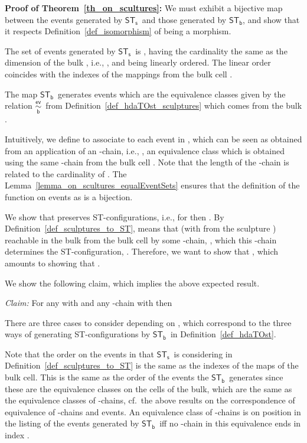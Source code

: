 \documentclass[submission,copyright,creativecommons]{eptcs}
\newenvironment{proof}[1][\!\!\,]{\vspace{1ex}\noindent\textbf{Proof #1: }}{\hfill\vspace{2ex}}
\newcounter{case}
\newcommand\sculpintost{\ensuremath{\mathsf{ST}_{\!\mathsf{s}}}}
\newcommand\hintostScultures{\ensuremath{\mathsf{ST}_{\!\mathsf{b}}}}
\newcommand\eventEquivHDAsculpture{\ensuremath{\overset{\mathsf{ev}}{\underset{\mathsf{b}}{\sim}}}}
\begin{document}
\begin{proof}[of Theorem~\ref{th_on_scultures}]
We must exhibit a bijective map  between the events generated by \sculpintost\ and those generated by \hintostScultures, and show that it respects Definition~\ref{def_isomorphism} of being a morphism. 

The set of events generated by \sculpintost\ is , having the cardinality the same as the dimension of the bulk , i.e., , and being linearly ordered. The linear order coincides with the indexes of the mappings from the bulk cell . 

The map \hintostScultures\ generates events which are the equivalence classes given by the relation \eventEquivHDAsculpture\ from Definition~\ref{def_hdaTOst_sculptures} which comes from the bulk .


Intuitively, we define  to associate to each event in , which can be seen as obtained from an application of an -chain, i.e., , an equivalence class which is obtained using the same -chain from the bulk cell . Note that the length of the -chain is related to the cardinality of .
The Lemma~\ref{lemma_on_scultures_equalEventSets} ensures that the definition of the function on events as  is a bijection.

We show that  preserves ST-configurations, i.e., for  then .
By Definition~\ref{def_sculptures_to_ST},  means that  (with  from the sculpture ) reachable in the bulk from the bulk cell by some -chain, , which this -chain determines the ST-configuration, .
Therefore, we want to show that , which amounts to showing that .

We show the following claim, which implies the above expected result.

\vspace{1ex}
\noindent\textit{Claim:}\hspace{1ex} For any  with  and any -chain with  then 

\vspace{0.5ex}

There are three cases to consider depending on , which correspond to the three ways of generating ST-configurations by \hintostScultures\ in Definition~\ref{def_hdaTOst}.

Note that the order on the events in  that \sculpintost\ is considering in Definition~\ref{def_sculptures_to_ST} is the same as the indexes of the maps of the  bulk cell. This is the same as the order of the events the \hintostScultures\ generates since these are the equivalence classes on the  cells of the bulk, which are the same as the equivalence classes of -chains, cf.\ the above results on the correspondence of equivalence of -chains and events. An equivalence class of -chains  is on position  in the listing of the events generated by \hintostScultures\ iff no -chain in this equivalence ends in index .


\end{proof}
\end{document}

